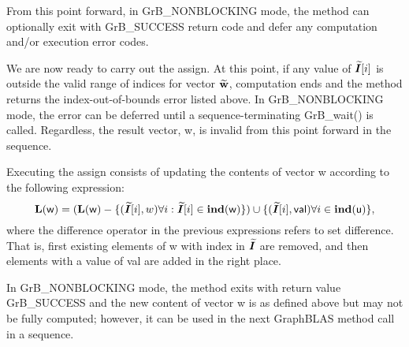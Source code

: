 From this point forward, in {\sf GrB\_NONBLOCKING} mode, the method can 
optionally exit with {\sf GrB\_SUCCESS} return code and defer any computation 
and/or execution error codes.

We are now ready to carry out the assign.
At this point, if any value of $\bm{\widetilde{I}}[i]$ is outside the valid 
range of indices for vector ${\bf \widetilde{w}}$, computation ends and the 
method returns the index-out-of-bounds error listed above. In 
{\sf GrB\_NONBLOCKING} mode, the error can be deferred until a 
sequence-terminating {\sf GrB\_wait()} is called.  Regardless, the result 
vector, {\sf w}, is invalid from this point forward in the 
sequence.

Executing the assign consists of updating the contents of vector {\sf w}
according to the following expression:
\[
	\bold{L}({\sf w}) = (\bold{L}({\sf w}) - \{(\bm{\widetilde{I}}[i],w) \forall i : \bm{\widetilde{I}}[i] \in \bold{ind}({\sf w})\})
	\cup \{(\bm{\widetilde{I}}[i],{\sf val}) \forall i \in \bold{ind}({\sf u})\},
\]
where the difference operator in the previous expressions refers to set difference.
That is, first existing elements of {\sf w} with index in $\bm{\widetilde{I}}$ are removed,
and then elements with a value of {\sf val} are added in the right place.

In {\sf GrB\_NONBLOCKING} mode, the method exits with return value 
{\sf GrB\_SUCCESS} and the new content of vector {\sf w} is as defined above 
but may not be fully computed; however, it can be used in the next GraphBLAS 
method call in a sequence.
